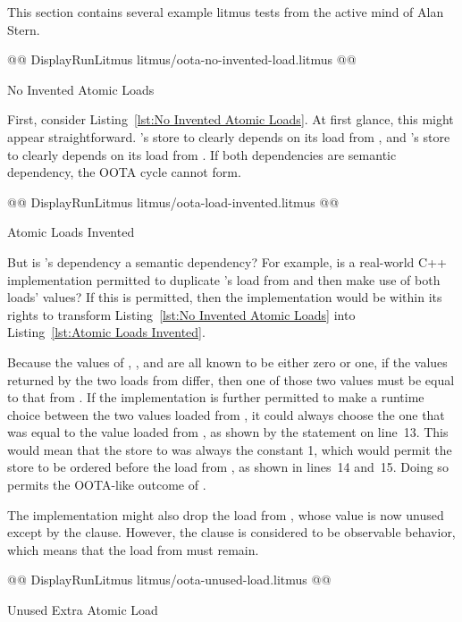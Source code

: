\documentclass[10]{article}
\begin{document}
This section contains several example litmus tests from the active
mind of Alan Stern.

\begin{listing}[tbp]
@@ DisplayRunLitmus litmus/oota-no-invented-load.litmus @@
\caption{No Invented Atomic Loads}
\label{lst:No Invented Atomic Loads}
\end{listing}

First, consider Listing~\ref{lst:No Invented Atomic Loads}.
At first glance, this might appear straightforward.
's store to  clearly depends on its load from ,
and 's store to  clearly depends on its load from .
If both dependencies are semantic dependency, the OOTA cycle cannot
form.

\begin{listing}[tbp]
@@ DisplayRunLitmus litmus/oota-load-invented.litmus @@
\caption{Atomic Loads Invented}
\label{lst:Atomic Loads Invented}
\end{listing}

But is 's dependency a semantic dependency?
For example, is a real-world C++ implementation permitted to
duplicate 's load from  and then make use of both loads'
values?
If this is permitted, then the implementation would be within its rights
to transform
Listing~\ref{lst:No Invented Atomic Loads}
into
Listing~\ref{lst:Atomic Loads Invented}.

Because the values of , , and  are all known to be
either zero or one, if the values returned by the two loads from 
differ, then one of those two values must be equal to that from .
If the implementation is further permitted to make a runtime choice
between the two values loaded from , it could always choose the
one that was equal to the value loaded from , as shown by the
 statement on line~13.
This would mean that the store to  was always the constant 1,
which would permit the store to be ordered before the load from ,
as shown in lines~14 and~15.
Doing so permits the OOTA-like outcome of .

The implementation might also drop the load from , whose value
is now unused except by the  clause.
However, the  clause is considered to be observable behavior,
which means that the load from  must remain.

\begin{listing}[tbp]
@@ DisplayRunLitmus litmus/oota-unused-load.litmus @@
\caption{Unused Extra Atomic Load}
\label{lst:Unused Extra Atomic Load}
\end{listing}
\end{document}
